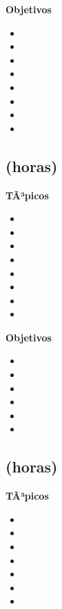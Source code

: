 \textbf{Objetivos}
\begin{itemize}
	\item \ARTRESObjUNO
	\item \ARTRESObjDOS
	\item \ARTRESObjTRES
	\item \ARTRESObjCUATRO
	\item \ARTRESObjCINCO
	\item \ARTRESObjSEIS
	\item \ARTRESObjSIETE
	\item \ARTRESObjOCHO
\end{itemize}

\subsection{\ARCUATRODef  (\ARCUATROHours horas)}\label{sec:BOK-AR4}

\textbf{TÃ³picos}
\begin{itemize}
	\item \ARCUATROTopicSistemas
	\item \ARCUATROTopicCodificacion
	\item \ARCUATROTopicJerarquia
	\item \ARCUATROTopicOrganizacion
	\item \ARCUATROTopicLatencia
	\item \ARCUATROTopicMemorias
	\item \ARCUATROTopicMemoria
	\item \ARCUATROTopicManejo
\end{itemize}

\textbf{Objetivos}
\begin{itemize}
	\item \ARCUATROObjUNO
	\item \ARCUATROObjDOS
	\item \ARCUATROObjTRES
	\item \ARCUATROObjCUATRO
	\item \ARCUATROObjCINCO
	\item \ARCUATROObjSEIS
\end{itemize}

\subsection{\ARCINCODef  (\ARCINCOHours horas)}\label{sec:BOK-AR5}

\textbf{TÃ³picos}
\begin{itemize}
	\item \ARCINCOTopicFundamentos
	\item \ARCINCOTopicEstructuras
	\item \ARCINCOTopicAlmacenamiento
	\item \ARCINCOTopicBuses
	\item \ARCINCOTopicIntroduccion
	\item \ARCINCOTopicSoporte
	\item \ARCINCOTopicArquitecturas
\end{itemize}

